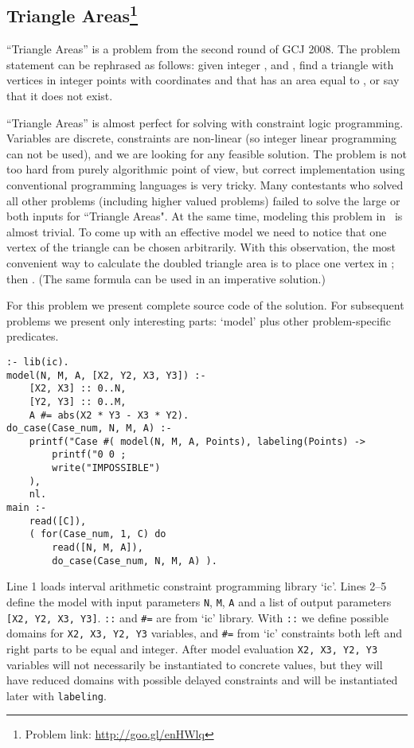 \documentclass{acm_proc_article-sp}
\begin{document}
\subsection*{Triangle Areas\footnote{Problem link: \url{http://goo.gl/enHWlq}}}

``Triangle Areas'' is a problem from the second round of GCJ 2008.
The problem statement can be rephrased as follows: given integer ,  and , find a
triangle with vertices in integer points with coordinates 
and  that has an area equal to , or say that it does not exist.

``Triangle Areas'' is almost perfect for solving with constraint logic programming. 
Variables are discrete, constraints are non-linear (so integer linear programming can not be used), and we are looking for any feasible solution.
The problem is not too hard from purely algorithmic point of view, but correct implementation using conventional programming languages is very tricky.
Many contestants who solved all other problems (including higher valued problems) failed to solve the large or both inputs for ``Triangle Areas".
At the same time, modeling this problem in \eclipse\ is almost trivial. 
To come up with an effective model we need to notice that one vertex of the triangle can be chosen arbitrarily.
With this observation, the most convenient way to calculate the doubled triangle area is to place one vertex in ; then . 
(The same formula can be used in an imperative solution.)

For this problem we present complete source code of the solution. 
For subsequent problems we present only interesting parts: `model' plus other problem-specific predicates.

\begin{lstlisting}[caption={Complete \eclipse\ program for the ``Triangle Areas'' problem}]
:- lib(ic).
model(N, M, A, [X2, Y2, X3, Y3]) :-
    [X2, X3] :: 0..N,
    [Y2, Y3] :: 0..M,
    A #= abs(X2 * Y3 - X3 * Y2).
do_case(Case_num, N, M, A) :-
    printf("Case #( model(N, M, A, Points), labeling(Points) ->
        printf("0 0 ; 
        write("IMPOSSIBLE") 
    ),
    nl.
main :-
    read([C]), 
    ( for(Case_num, 1, C) do 
        read([N, M, A]),
        do_case(Case_num, N, M, A) ).
\end{lstlisting}

Line 1 loads interval arithmetic constraint programming library `ic'. 
Lines 2--5 define the model with input parameters \texttt{N}, \texttt{M}, \texttt{A} and a list of output parameters \texttt{[X2, Y2, X3, Y3]}.
\texttt{::} and \texttt{\#=} are from `ic' library. 
With \texttt{::} we define possible domains for \texttt{X2, X3, Y2, Y3} variables,
and \texttt{\#=} from `ic' constraints both left and right parts to be equal and integer.
After model evaluation \texttt{X2, X3, Y2, Y3} variables will not necessarily be instantiated to concrete values, but they will have reduced domains with possible delayed constraints 
and will be instantiated later with \texttt{labeling}.
\end{document}

